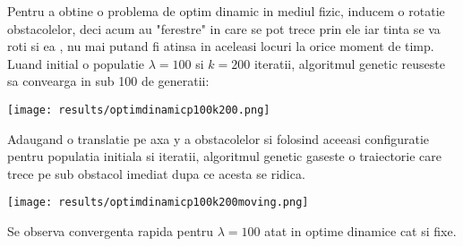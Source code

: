 Pentru a obtine o problema de optim dinamic in mediul fizic, inducem o rotatie obstacolelor, deci acum au "ferestre" in care se pot trece prin ele iar tinta se va roti si ea , nu mai putand fi atinsa in aceleasi locuri la orice moment de timp. Luand initial o populatie $\lambda = 100$ si $k=200$ iteratii, algoritmul genetic reuseste sa convearga in sub 100 de generatii:

\begin{center}
    \texttt{[image: results/optimdinamicp100k200.png]}
\end{center}

Adaugand o translatie pe axa y a obstacolelor si folosind aceeasi configuratie pentru populatia initiala si iteratii, algoritmul genetic gaseste o traiectorie care trece pe sub obstacol imediat dupa ce acesta se ridica.

\begin{center}
    \texttt{[image: results/optimdinamicp100k200moving.png]}
\end{center}

Se observa convergenta rapida pentru $\lambda = 100$ atat in optime dinamice cat si fixe. 